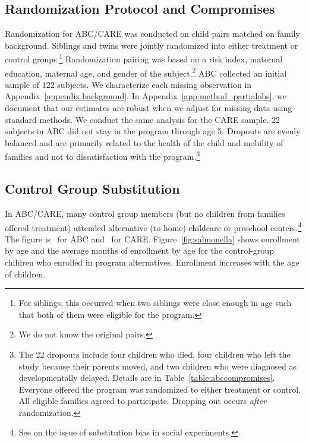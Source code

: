 \subsection{Randomization Protocol and Compromises} \label{section:randomization}

Randomization for ABC/CARE was conducted on child pairs matched on family background. Siblings and twins were jointly randomized into either treatment or control groups.\footnote{For siblings, this occurred when two siblings were close enough in age such that both of them were eligible for the program.} Randomization pairing was based on a risk index, maternal education, maternal age, and gender of the subject.\footnote{We do not know the original pairs.} ABC collected an initial sample of 122 subjects. We characterize each missing observation in Appendix~\ref{appendix:background}. In Appendix~\ref{app:method_partialobs}, we document that our estimates are robust when we adjust for missing data using standard methods. We conduct the same analysis for the CARE sample. 22 subjects in ABC did not stay in the program through age 5. Dropouts are evenly balanced and are primarily related to the health of the child and mobility of families and not to dissatisfaction with the program.\footnote{The 22 dropouts include four children who died, four children who left the study because their parents moved, and two children who were diagnosed as developmentally delayed. Details are in Table~\ref{table:abccompromises}. Everyone offered the program was randomized to either treatment or control. All eligible families agreed to participate. Dropping out occurs \emph{after} randomization.}

\subsection{Control Group Substitution}

In ABC/CARE, many control group members (but no children from families offered treatment) attended alternative (to home) childcare or preschool centers.\footnote{See \cite{Heckman_Hohmann_etal_2000_QJE} on the issue of substitution bias in social experiments.} The figure is \treatsubsabc\ for ABC and \treatsubscarec\ for CARE. Figure~\ref{fig:salmonella} shows enrollment by age and the average months of enrollment by age for the control-group children who enrolled in program alternatives. Enrollment increases with the age of children.

